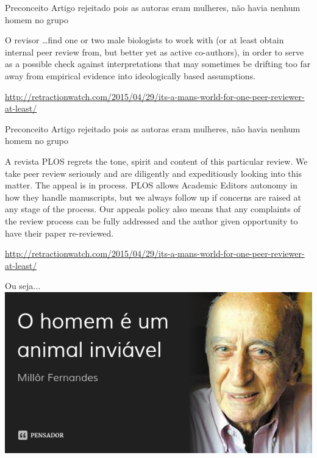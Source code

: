 \documentclass{beamer}
\begin{document}
\begin{frame}{Preconceito}
  Artigo rejeitado pois as autoras eram mulheres, não havia nenhum
  homem no grupo
    \begin{block}{O revisor}
      \ldots find one or two male biologists to work with (or at least
      obtain internal peer review from, but better yet as active
      co-authors), in order to serve as a possible check against
      interpretations that may sometimes be drifting too far away from
      empirical evidence into ideologically based assumptions.
    \end{block}

\url{http://retractionwatch.com/2015/04/29/its-a-mans-world-for-one-peer-reviewer-at-least/}
\end{frame}

\begin{frame}{Preconceito}
  Artigo rejeitado pois as autoras eram mulheres, não havia nenhum
  homem no grupo
    \begin{block}{A revista}
      PLOS regrets the tone, spirit and content of this particular
      review. We take peer review seriously and are diligently and
      expeditiously looking into this matter. The appeal is in
      process. PLOS allows Academic Editors autonomy in how they
      handle manuscripts, but we always follow up if concerns are
      raised at any stage of the process. Our appeals policy also
      means that any complaints of the review process can be fully
      addressed and the author given opportunity to have their paper
      re-reviewed.
    \end{block}

\url{http://retractionwatch.com/2015/04/29/its-a-mans-world-for-one-peer-reviewer-at-least/}
\end{frame}

\begin{frame}{Ou seja...}
  \includegraphics[width=\textwidth]{millor}
\end{frame}
\end{document}

